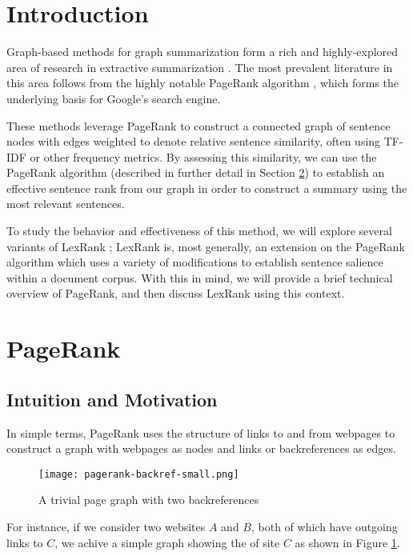 \documentclass[../writeup.tex]{subfiles}
\begin{document}
\section{Introduction}\label{kennan:sec:intro}
Graph-based methods for graph summarization form a rich and highly-explored area of
research in extractive summarization \autocite*[]{brief-summarization-survey}. The most prevalent
literature in this area follows from the highly notable PageRank algorithm \autocite*{pagerank},
which forms the underlying basis for Google's search engine.

These methods leverage PageRank to construct a connected graph of sentence nodes with edges
weighted to denote relative sentence similarity, often using TF-IDF or other frequency metrics.
By assessing this similarity, we can use the PageRank algorithm
(described in further detail in Section \ref{kennan:sec:pagerank}) to establish an effective
sentence rank from our graph in order to construct a summary using the most relevant sentences.

To study the behavior and effectiveness of this method, we will explore several variants of
LexRank \autocite*{lexrank-summarization}; LexRank is, most generally, an extension on the
PageRank algorithm \autocite*[]{pagerank} which uses a variety of modifications to establish
sentence salience within a document corpus. With this in mind, we will provide a brief
technical overview of PageRank, and then discuss LexRank \autocite*[]{lexrank-summarization} using this context.

\section{PageRank}\label{kennan:sec:pagerank}
\subsection{Intuition and Motivation}\label{kennan:sec:pagerank-intuition}
In simple terms, PageRank uses the structure of links to and from webpages to construct
a graph with webpages as nodes and links or backreferences as edges.
\begin{figure}[ht]
    \centering
    \texttt{[image: pagerank-backref-small.png]}
    \caption{A trivial page graph with two backreferences \autocite*[]{pagerank}}
    \label{kennan:fig:pagerank-backref-small}
\end{figure}
For instance, if we consider two websites $A$ and $B$,
both of which have outgoing links to $C$, we achive a simple graph
showing the  of site $C$ as shown in Figure \ref{kennan:fig:pagerank-backref-small}.
\end{document}

